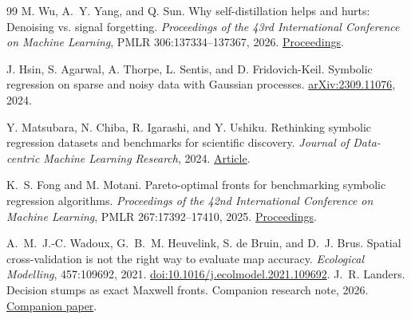 \documentclass[11pt]{article}
\begin{document}
{\begin{thebibliography}{99}
M. Wu, A.~Y. Yang, and Q. Sun.
Why self-distillation helps and hurts: Denoising vs. signal forgetting.
\emph{Proceedings of the 43rd International Conference on Machine Learning},
PMLR 306:137334--137367, 2026.
\href{https://proceedings.mlr.press/v306/wu26bs.html}{Proceedings}.

J. Hsin, S. Agarwal, A. Thorpe, L. Sentis, and D. Fridovich-Keil.
Symbolic regression on sparse and noisy data with Gaussian processes.
\href{https://arxiv.org/abs/2309.11076}{arXiv:2309.11076}, 2024.

Y. Matsubara, N. Chiba, R. Igarashi, and Y. Ushiku.
Rethinking symbolic regression datasets and benchmarks for scientific discovery.
\emph{Journal of Data-centric Machine Learning Research}, 2024.
\href{https://data.mlr.press/assets/pdf/v01-3.pdf}{Article}.

K.~S. Fong and M. Motani.
Pareto-optimal fronts for benchmarking symbolic regression algorithms.
\emph{Proceedings of the 42nd International Conference on Machine Learning},
PMLR 267:17392--17410, 2025.
\href{https://proceedings.mlr.press/v267/fong25b.html}{Proceedings}.

A.~M.~J.-C. Wadoux, G.~B.~M. Heuvelink, S. de Bruin, and D.~J. Brus.
Spatial cross-validation is not the right way to evaluate map accuracy.
\emph{Ecological Modelling}, 457:109692, 2021.
\href{https://doi.org/10.1016/j.ecolmodel.2021.109692}{doi:10.1016/j.ecolmodel.2021.109692}.
J.~R. Landers.
Decision stumps as exact Maxwell fronts.
Companion research note, 2026.
\href{https://github.com/jonland82/blind-field-discovery/blob/52cd50c/papers/05-equivalent-descriptions/stumps_as_maxwell_fronts.pdf}{Companion paper}.

\end{thebibliography}}
\end{document}
